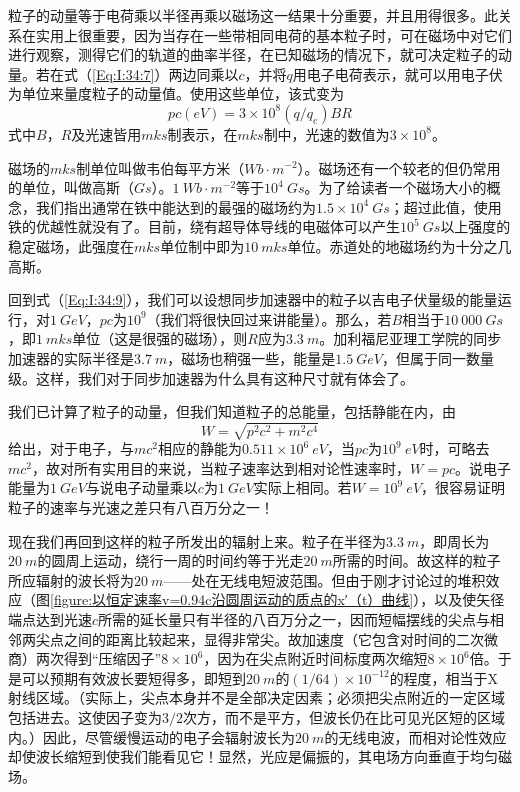 粒子的动量等于电荷乘以半径再乘以磁场这一结果十分重要，并且用得很多。此关系在实用上很重要，因为当存在一些带相同电荷的基本粒子时，可在磁场中对它们进行观察，测得它们的轨道的曲率半径，在已知磁场的情况下，就可决定粒子的动量。若在式（\ref{Eq:I:34:7}）两边同乘以$c$，并将$q$用电子电荷表示，就可以用电子伏为单位来量度粒子的动量值。使用这些单位，该式变为
\begin{equation}
    \label{Eq:I:34:9}
    pc(eV) = 3\times 10^8 (q/q_e)BR
\end{equation}
式中$B$，$R$及光速皆用$mks$制表示，在$mks$制中，光速的数值为$3\times 10^8$。

磁场的$mks$制单位叫做韦伯每平方米（$Wb\cdot m^{-2}$）。磁场还有一个较老的但仍常用的单位，叫做高斯（$Gs$）。$1~Wb\cdot m^{-2}$等于$10^4~Gs$。为了给读者一个磁场大小的概念，我们指出通常在铁中能达到的最强的磁场约为$1.5\times 10^4~Gs$；超过此值，使用铁的优越性就没有了。目前，绕有超导体导线的电磁体可以产生$10^5~Gs$以上强度的稳定磁场，此强度在$mks$单位制中即为$10~mks$单位。赤道处的地磁场约为十分之几高斯。

回到式（\ref{Eq:I:34:9}），我们可以设想同步加速器中的粒子以吉电子伏量级的能量运行，对$1~GeV$，$pc$为$10^9$（我们将很快回过来讲能量）。那么，若$B$相当于$10~000~Gs$，即$1~mks$单位（这是很强的磁场），则$R$应为$3.3~m$。加利福尼亚理工学院的同步加速器的实际半径是$3.7~m$，磁场也稍强一些，能量是$1.5~GeV$，但属于同一数量级。这样，我们对于同步加速器为什么具有这种尺寸就有体会了。

我们已计算了粒子的动量，但我们知道粒子的总能量，包括静能在内，由
\begin{equation*}
    W=\sqrt{p^2c^2 + m^2c^4}
\end{equation*}
给出，对于电子，与$mc^2$相应的静能为$0.511\times 10^6~eV$，当$pc$为$10^9~eV$时，可略去$mc^2$，故对所有实用目的来说，当粒子速率达到相对论性速率时，$W=pc$。说电子能量为$1~GeV$与说电子动量乘以$c$为$1~GeV$实际上相同。若$W=10^9~eV$，很容易证明粒子的速率与光速之差只有八百万分之一！

现在我们再回到这样的粒子所发出的辐射上来。粒子在半径为$3.3~m$，即周长为$20~m$的圆周上运动，绕行一周的时间约等于光走$20~m$所需的时间。故这样的粒子所应辐射的波长将为$20~m$——处在无线电短波范围。但由于刚才讨论过的堆积效应（图\ref{figure:以恒定速率v=0.94c沿圆周运动的质点的x′（t）曲线}），以及使矢径端点达到光速$c$所需的延长量只有半径的八百万分之一，因而短幅摆线的尖点与相邻两尖点之间的距离比较起来，显得非常尖。故加速度（它包含对时间的二次微商）两次得到“压缩因子”$8\times 10^6$，因为在尖点附近时间标度两次缩短$8\times 10^6$倍。于是可以预期有效波长要短得多，即短到$20~m$的$(1/64)\times 10^{-12}$的程度，相当于X射线区域。（实际上，尖点本身并不是全部决定因素；必须把尖点附近的一定区域包括进去。这使因子变为$3/2$次方，而不是平方，但波长仍在比可见光区短的区域内。）因此，尽管缓慢运动的电子会辐射波长为$20~m$的无线电波，而相对论性效应却使波长缩短到使我们能看见它！显然，光应是偏振的，其电场方向垂直于均匀磁场。

